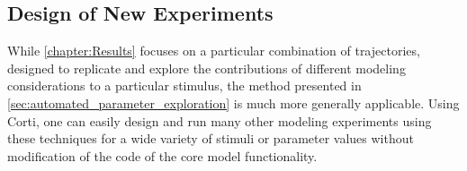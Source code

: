 \subsection{Design of New Experiments} %
\label{sub:design_of_new_experiments}
While \autoref{chapter:Results} focuses on a particular combination of trajectories, designed to replicate and explore the contributions of different modeling considerations to a particular stimulus, the method presented in \autoref{sec:automated_parameter_exploration} is much more generally applicable.  Using Corti, one can easily design and run many other modeling experiments using these techniques for a wide variety of stimuli or parameter values without modification of the code of the core model functionality. 
